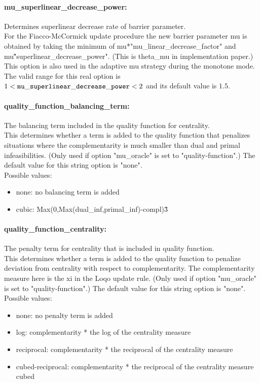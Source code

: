 \paragraph{mu\_superlinear\_decrease\_power:}\label{opt:mu_superlinear_decrease_power} Determines superlinear decrease rate of barrier parameter. \\
 For the Fiacco-McCormick update procedure the new barrier parameter mu is obtained by taking the minimum of mu*"mu\_linear\_decrease\_factor" and mu\^"superlinear\_decrease\_power".  (This is theta\_mu in implementation paper.) This option is also used in the adaptive mu strategy during the monotone mode. The valid range for this real option is 
$1 <  {\tt mu\_superlinear\_decrease\_power } <  2$
and its default value is $1.5$.


\paragraph{quality\_function\_balancing\_term:}\label{opt:quality_function_balancing_term} The balancing term included in the quality function for centrality. \\
 This determines whether a term is added to the quality function that penalizes situations where the complementarity is much smaller than dual and primal infeasibilities. (Only used if option "mu\_oracle" is set to "quality-function".) The default value for this string option is "none".
\\ 
Possible values:
\begin{itemize}
   \item none: no balancing term is added
   \item cubic: Max(0,Max(dual\_inf,primal\_inf)-compl)\^3
\end{itemize}

\paragraph{quality\_function\_centrality:}\label{opt:quality_function_centrality} The penalty term for centrality that is included in quality function. \\
 This determines whether a term is added to the quality function to penalize deviation from centrality with respect to complementarity.  The complementarity measure here is the xi in the Loqo update rule. (Only used if option "mu\_oracle" is set to "quality-function".) The default value for this string option is "none".
\\ 
Possible values:
\begin{itemize}
   \item none: no penalty term is added
   \item log: complementarity * the log of the centrality measure
   \item reciprocal: complementarity * the reciprocal of the centrality measure
   \item cubed-reciprocal: complementarity * the reciprocal of the centrality measure cubed
\end{itemize}

